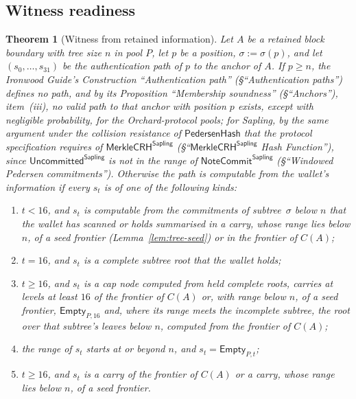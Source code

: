 \documentclass[11pt,a4paper]{article}
\newtheorem{theorem}{Theorem}[section]
\theoremstyle{definition}
\begin{document}
\subsection{Witness readiness}\label{sec:tree-ready}

\begin{theorem}[Witness from retained information]\label{thm:tree-witness}
Let $A$ be a retained block boundary with tree size $n$ in pool $P$, let
$p$ be a position, $\sigma := \sigma(p)$, and let $(s_0, \dots, s_{31})$ be
the authentication path of $p$ to the anchor of $A$. If $p \ge n$, the
\emph{Ironwood Guide}'s Construction ``Authentication path'' (\S``Authentication
paths'') defines no path, and by its Proposition ``Membership soundness''
(\S``Anchors''), item~(iii), no valid path to that anchor with position $p$
exists, except with negligible probability, for the Orchard-protocol
pools; for Sapling, by the same argument under the collision resistance of
$\mathsf{PedersenHash}$ that the protocol specification requires of
$\mathsf{MerkleCRH}^{\mathsf{Sapling}}$
(\S``$\mathsf{MerkleCRH}^{\mathsf{Sapling}}$ Hash Function''), since
$\mathsf{Uncommitted}^{\mathsf{Sapling}}$ is not in the range of
$\mathsf{NoteCommit}^{\mathsf{Sapling}}$ (\S``Windowed Pedersen
commitments'').
Otherwise the path is computable from the wallet's information if every $s_t$
is of one of the following kinds:
\begin{enumerate}[label=(\alph*)]
\item $t < 16$, and $s_t$ is computable from the commitments of
  subtree~$\sigma$ below $n$ that the wallet has scanned or holds summarised
  in a carry, whose range lies below $n$, of a seed frontier
  (Lemma~\ref{lem:tree-seed}) or in the frontier of $C(A)$;
\item $t = 16$, and $s_t$ is a complete subtree root that the wallet holds;
\item $t \ge 16$, and $s_t$ is a cap node computed from held complete
  roots, carries at levels at least $16$ of the frontier of $C(A)$ or, with
  range below $n$, of a seed frontier, $\mathsf{Empty}_{P,16}$ and, where
  its range meets the incomplete subtree, the root over that subtree's
  leaves below $n$, computed from the frontier of $C(A)$;
\item the range of $s_t$ starts at or beyond $n$, and $s_t =
  \mathsf{Empty}_{P,t}$;
\item $t \ge 16$, and $s_t$ is a carry of the frontier of $C(A)$ or a carry,
  whose range lies below $n$, of a seed frontier.
\end{enumerate}
\end{theorem}
\end{document}
